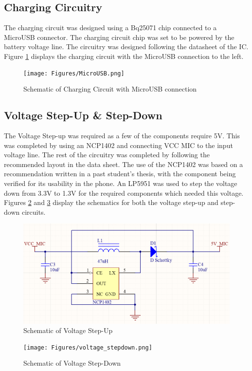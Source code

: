 \subsection{Charging Circuitry}

	The charging circuit was designed using a Bq25071 chip connected to a MicroUSB connector. 
The charging circuit chip was set to be powered by the battery voltage line. The circuitry was designed following the datasheet of the IC.
Figure \ref{fig:charger} displays the charging circuit with the MicroUSB connection to the left. 

\begin{figure}
	\texttt{[image: Figures/MicroUSB.png]}\centering
	\caption{Schematic of Charging Circuit with MicroUSB connection}
	\label{fig:charger}
\end{figure}

\subsection{Voltage Step-Up \& Step-Down}

	The Voltage Step-up was required as a few of the components require 5V. 
This was completed by using an NCP1402 and connecting VCC MIC to the input voltage line. 
The rest of the circuitry was completed by following the recommended layout in the data sheet. 
The use of the NCP1402 was based on a recommendation written in a past student's thesis, with the component being verified for its usability in the phone. 
An LP5951 was used to step the voltage down from 3.3V to 1.3V for the required components which needed this voltage. 
Figures \ref{fig:stepup} and \ref{fig:stepdown} display the schematics for both the voltage step-up and step-down circuits.

\begin{figure}
	\includegraphics[width=0.5\linewidth]{Figures/voltage_stepup_5.png}\centering
	\caption{Schematic of Voltage Step-Up}
	\label{fig:stepup}
\end{figure}

\begin{figure}
	\texttt{[image: Figures/voltage\_stepdown.png]}\centering
	\caption{Schematic of Voltage Step-Down}
	\label{fig:stepdown}
\end{figure}

